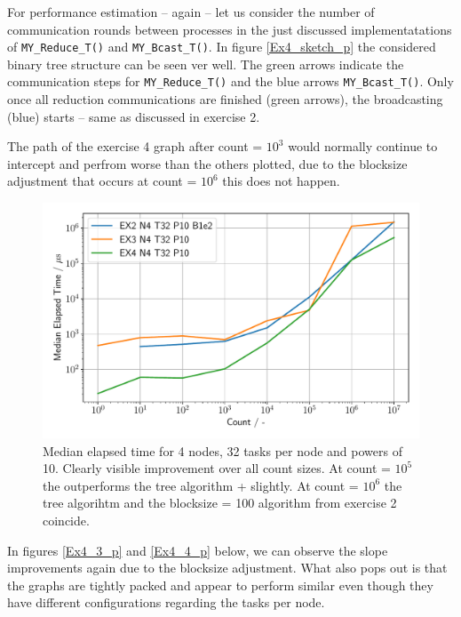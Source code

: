 For performance estimation -- again -- let us consider the number of communication rounds between processes in the 
just discussed implementatations of \texttt{MY\_Reduce\_T()} and \texttt{MY\_Bcast\_T()}. In figure 
\ref{Ex4_sketch_p} the considered binary tree structure can be seen ver well. The green arrows 
indicate the communication steps for \texttt{MY\_Reduce\_T()} and the blue arrows \texttt{MY\_Bcast\_T()}. 
Only once all reduction communications are finished (green arrows), the broadcasting (blue) starts -- same as discussed in 
exercise 2. 

\pagebreak

The path of the exercise 4 graph after count = $10^3$ would normally continue to intercept and perfrom worse
than the others plotted, due to the blocksize adjustment that occurs at count = $10^6$ this does not happen.

\begin{figure}[h]
    \begin{center}
        \includegraphics[width=0.85\linewidth]{figures/Ex4_1.pdf}
        \caption{Median elapsed time for 4 nodes, 32 tasks per node and powers of 10. Clearly visible improvement
        over all count sizes. At count = $10^5$ the  outperforms the tree algorithm
         +  slightly. At count = $10^6$ the tree algorihtm and the 
        blocksize = 100 algorithm from exercise 2 coincide.}
        \label{Ex4_1_p}
    \end{center}
\end{figure}

In figures \ref{Ex4_3_p} and \ref{Ex4_4_p} below, we can observe the slope improvements again due to the
blocksize adjustment. What also pops out is that the graphs are tightly packed and appear to perform similar
even though they have different configurations regarding the tasks per node. 

